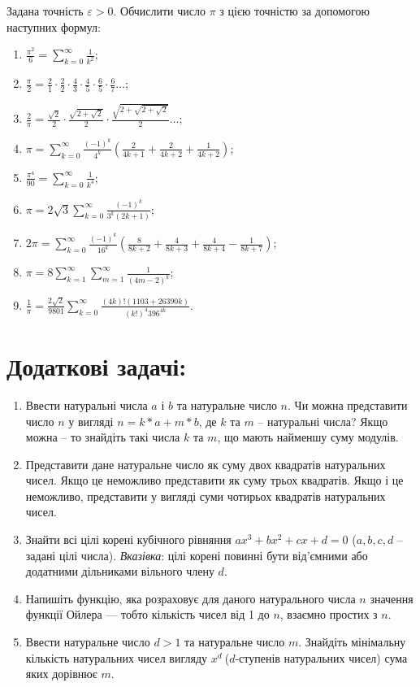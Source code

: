 \documentclass[a5paper,titlepage,openany,twoside,
]
{book_unv}%
\makeatletter
\newcommand{\xslalph}[1]{\expandafter\@xslalph\csname c@#1\endcsname}
\newcommand{\@xslalph}[1]{%
    \ifcase#1\or а\or б\or в\or г\or д\or e\or є\or ж\or з\or i%
    \or й\or к\or л\or м\or н\or о\or п\or р\or с\or т%
    \or у\or ф\or х\or ц\or ч\or ш\or ю\or я\or аа\or бб\or вв%
    \else\@ctrerr\fi%
}
\makeatother
\begin{document}
\begin{enumerate}
 Задана точність $\varepsilon>0$. Обчислити число $\pi$ 
з цією точністю за допомогою наступних формул:
\begin{enumerate}[label=\xslalph*)]
\item
 $ \frac{\pi^2}{6} = \sum\limits_{k=0}^{\infty} \frac{1}{k^2} $;
\item
 $\frac{\pi}{2} = \frac{2}{1} \cdot \frac{2}{2} \cdot \frac{4}{3} \cdot \frac{4}{5} \cdot \frac{6}{5}\cdot \frac{6}{7} \ldots $;
\item
$\frac{2}{\pi} = \frac{\sqrt{2}}{2} \cdot \frac{\sqrt{2 + \sqrt{2}}}{2} \cdot \frac{\sqrt{2 + \sqrt{2+\sqrt{2}}}}{2} \ldots $;
\item
$\pi = \sum\limits_{k=0}^{\infty} \frac{(-1)^{k}}{4^{k}}\left( \frac{2}{4k+1} + \frac{2}{4k+2} + \frac{1}{4k+2}\right)$;
\item
 $ \frac{\pi^4}{90} = \sum\limits_{k=0}^{\infty} \frac{1}{k^4} $;
\item
 $ \pi = 2\sqrt{3} \sum\limits_{k=0}^{\infty} \frac{(-1)^{k}}{3^{k}(2k+1)} $;
\item
$ 2\pi = \sum\limits_{k=0}^{\infty} \frac{(-1)^{k}}{16^{k}}\left( \frac{8}{8k+2} + \frac{4}{8k+3} + \frac{4}{8k+4}  - \frac{1}{8k+7}\right)$;
\item
$ \pi = 8 \sum\limits_{k=1}^{\infty} \sum\limits_{m=1}^{\infty} \frac{1}{(4m-2)^{k}} $;
\item
$ \frac{1}{\pi} = \frac{2 \sqrt{2}}{9801} \sum\limits_{k=0}^{\infty}  \frac{(4k)!(1103 +26390k)}{(k!)^{4}396^{4k}} $.

\end{enumerate}
\end{enumerate}
 \section{Додаткові задачі:}

\begin{enumerate}
\def\labelenumi{\arabic{enumi})}
\setcounter{enumi}{26}
\item
  Ввести натуральні числа $a$ і $b$ та натуральне число $n$. Чи можна
  представити число $n$ у вигляді $n= k*a + m*b$, де $k$ та $m$ -- натуральні
  числа? Якщо можна -- то знайдіть такі числа $k$ та $m$, що мають найменшу
  суму модулів.
\item
  Представити дане натуральне число як суму двох квадратів натуральних
  чисел. Якщо це неможливо представити як суму трьох квадратів. Якщо і
  це неможливо, представити у вигляді суми чотирьох квадратів
  натуральних чисел.
\item
  Знайти всі цілі корені кубічного рівняння $ax^3 + bx^2 + cx + d = 0$ ($a,b,c,d$ 
-- задані цілі числа). \emph{Вказівка}: цілі корені повинні бути від'ємними
 або додатними дільниками вільного члену $d$.
\item
  Напишіть функцію, яка розраховує для даного натурального числа $n$
  значення функції Ойлера --- тобто кількість чисел від 1 до $n$, взаємно простих з
  $n$.
\item
  Ввести натуральне число \(d > 1\) та натуральне число $m$. Знайдіть
  мінімальну кількість натуральних чисел вигляду \(x^{d}\ \)(\(d\)-ступенів
  натуральних чисел) сума яких дорівнює $m$.
\end{enumerate}
\end{document}
